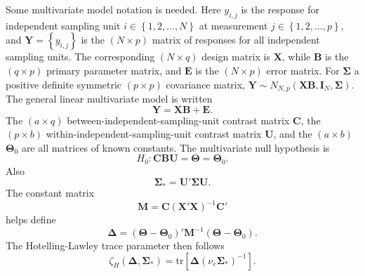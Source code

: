 \documentclass[11pt]{article}
\begin{document}
Some multivariate model notation is needed. Here $y_{i,j}$ is the response for independent sampling unit $i\in\left\{1,2,\ldots,N\right\}$ at measurement $j\in\left\{1,2,\ldots,p\right\}$, and $\boldsymbol{Y}=\left\{y_{i,j}\right\}$ is the $\left(N\times p\right)$ matrix of responses for all independent sampling units. The corresponding $\left(N\times q\right)$ design matrix is $\boldsymbol{X}$, while $\boldsymbol{B}$ is the $\left(q\times p\right)$ primary parameter matrix, and $\boldsymbol{E}$ is the $\left(N\times p\right)$ error matrix. For $\boldsymbol{\Sigma}$ a positive definite symmetric $\left(p\times p\right)$ covariance matrix, $\boldsymbol{Y}\sim N_{N,p}\left(\boldsymbol{X}\boldsymbol{B},\boldsymbol{I}_{N},\boldsymbol{\Sigma}\right)$. The general linear multivariate model is written
\begin{equation}
\boldsymbol{Y}=\boldsymbol{X}\boldsymbol{B}+\boldsymbol{E}.
\end{equation}
The $\left(a\times q\right)$ between-independent-sampling-unit contrast matrix $\boldsymbol{C}$, the $\left(p\times b\right)$ within-independent-sampling-unit contrast matrix $\boldsymbol{U}$, and the $\left(a\times b\right)$ $\boldsymbol{\Theta}_{0}$ are all matrices of known constants. The multivariate null hypothesis is
\begin{equation}
H_0:\boldsymbol{CBU}=\boldsymbol{\Theta}=\boldsymbol{\Theta}_{0}.
\end{equation}
Also
\begin{equation}
\boldsymbol{\Sigma}_{\ast} = \boldsymbol{U}'\boldsymbol{\Sigma U}.
\end{equation}
The constant matrix 
\begin{equation}
\boldsymbol{M}=\boldsymbol{C}\left(\boldsymbol{X}'\boldsymbol{X}\right)^{-1}\boldsymbol{C}'
\end{equation}
helps define
\begin{equation}
\boldsymbol{\Delta} = \left(\boldsymbol{\Theta}-\boldsymbol{\Theta}_{0}\right)'\boldsymbol{M}^{-1}\left(\boldsymbol{\Theta}-\boldsymbol{\Theta}_{0}\right).
\end{equation}
The Hotelling-Lawley trace parameter then follows 
\begin{equation}
\zeta_{H}\left(\boldsymbol{\Delta}, \boldsymbol{\Sigma}_{\ast}\right)=\text{tr}\left[\boldsymbol{\Delta}\left(\nu_{e}\boldsymbol{\Sigma}_{\ast}\right)^{-1}\right].
\end{equation}
\end{document}

